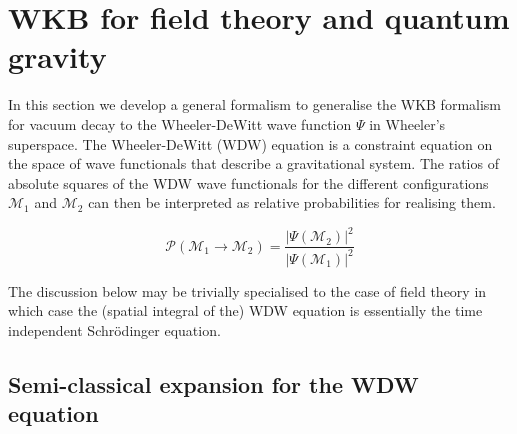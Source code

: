 \documentclass[a4paper,11pt]{article}
\numberwithin{equation}{section}
\begin{document}
\section{WKB for field theory and quantum gravity}
\label{sec:WKBandWDW}

In this section we develop a general formalism to generalise the WKB formalism for vacuum decay to the Wheeler-DeWitt wave function $\Psi$ in Wheeler's superspace. The Wheeler-DeWitt (WDW) equation is a constraint equation on the space of wave functionals that describe a gravitational system. The ratios of absolute squares of the WDW wave functionals for the different configurations ${\mathcal M}_1$ and ${\mathcal M}_2$ can then be interpreted as relative  probabilities for realising them.

\begin{equation}
{\mathcal P}({\mathcal M}_1\rightarrow {\mathcal M}_2) = \frac{|\Psi({\mathcal M}_2)|^2}{|\Psi({\mathcal M}_1)|^2}
\end{equation}

 The discussion below may be trivially specialised to the case of field theory in which case the (spatial integral of the) WDW equation is essentially the time independent Schr\"odinger equation.

\subsection{Semi-classical expansion  for the WDW equation}
\end{document}
